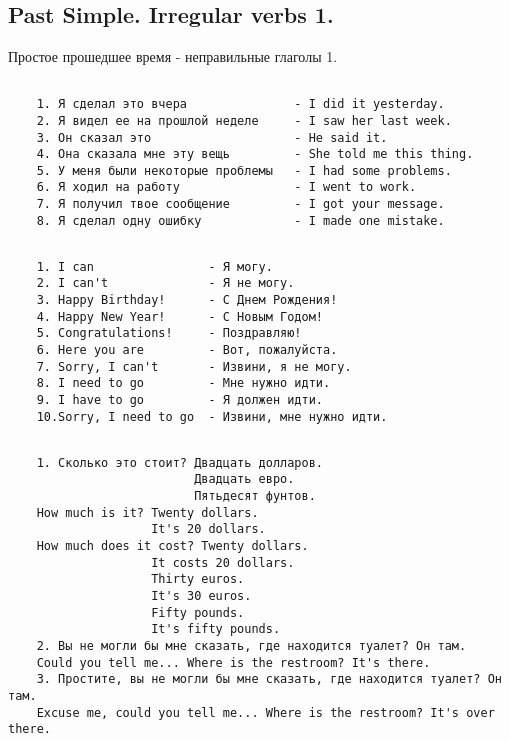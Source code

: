 \subsection{Past Simple. Irregular verbs 1.}
Простое прошедшее время - неправильные глаголы 1.
\subsection*{}
\begin{verbatim}
    1. Я сделал это вчера               - I did it yesterday.
    2. Я видел ее на прошлой неделе     - I saw her last week.
    3. Он сказал это                    - He said it.
    4. Она сказала мне эту вещь         - She told me this thing.
    5. У меня были некоторые проблемы   - I had some problems.
    6. Я ходил на работу                - I went to work.
    7. Я получил твое сообщение         - I got your message.
    8. Я сделал одну ошибку             - I made one mistake.
\end{verbatim}

\subsection*{}
\begin{verbatim}
    1. I can                - Я могу.
    2. I can't              - Я не могу.
    3. Happy Birthday!      - С Днем Рождения!
    4. Happy New Year!      - С Новым Годом!
    5. Congratulations!     - Поздравляю!
    6. Here you are         - Вот, пожалуйста.
    7. Sorry, I can't       - Извини, я не могу.
    8. I need to go         - Мне нужно идти.
    9. I have to go         - Я должен идти.
    10.Sorry, I need to go  - Извини, мне нужно идти.
\end{verbatim}

\subsection*{}
\begin{verbatim}
    1. Сколько это стоит? Двадцать долларов.
                          Двадцать евро.
                          Пятьдесят фунтов.
    How much is it? Twenty dollars.
                    It's 20 dollars.
    How much does it cost? Twenty dollars.
                    It costs 20 dollars.
                    Thirty euros.
                    It's 30 euros.
                    Fifty pounds.
                    It's fifty pounds.
    2. Вы не могли бы мне сказать, где находится туалет? Он там.
    Could you tell me... Where is the restroom? It's there.
    3. Простите, вы не могли бы мне сказать, где находится туалет? Он там.
    Excuse me, could you tell me... Where is the restroom? It's over there.
\end{verbatim}

